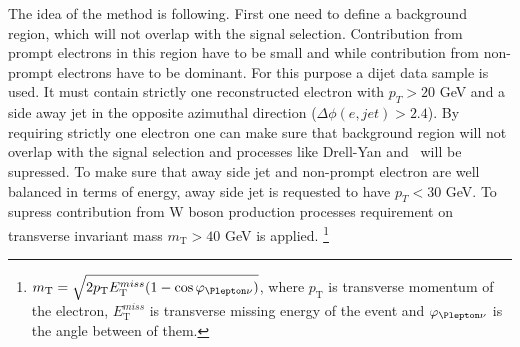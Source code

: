 The idea of the method is following. 
First one need to define a background region, which will not overlap with the signal selection.
Contribution from prompt electrons in this region have to be small and while contribution from non-prompt electrons have to be dominant.
For this purpose a dijet data sample is used. It must contain strictly one reconstructed electron with $p_T > 20$ GeV
and a side away jet in the opposite azimuthal direction ($\Delta \phi (e,jet) > 2.4$).
By requiring strictly one electron one can make sure that background region will not overlap with the signal selection and processes 
like Drell-Yan and \ttbar~will be supressed.
To make sure that away side jet and non-prompt electron are well balanced in terms of energy, away side jet is
requested to have $p_T < 30$ GeV.
To supress contribution from W boson production processes requirement on transverse invariant mass 
$m_\mathrm{T} > 40$ GeV is applied.
\footnote{$m_\mathrm{T} = \sqrt{2 p_\mathrm{T} E_\mathrm{T}^{miss} (1-\cos\varphi_{\Plepton\nu})}$, where
$p_\mathrm{T}$ is transverse momentum of the electron, $E_\mathrm{T}^{miss}$ is transverse missing energy of the event
and $\varphi_{\Plepton\nu}$ is the angle between of them.}


